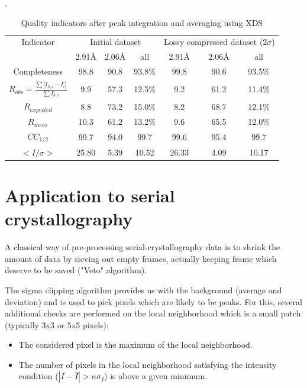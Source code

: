 \documentclass[a4paper,12pt,oneside]{article}              %
\begin{document}
\begin{table}[h]
\begin{center}
\label{xds_summary}
\caption{Quality indicators after peak integration and averaging using XDS\cite{xds}}.
\begin{tabular}{|c|c c c|c c c|} 
\hline
Indicator & \multicolumn{3}{c|}{Initial dataset} & \multicolumn{3}{c|}{Lossy compressed dataset ($2\sigma$)} \\ 
          & 2.91\AA & 2.06\AA & all & 2.91\AA & 2.06\AA & all \\
\hline
Completeness                                        & 98.8& 90.8 & 93.8\% & 99.8& 90.6 & 93.5\% \\ 
$R_{obs}=\frac{\sum |I_{h,i}-I_{i}|}{\sum I_{h,i}}$ & 9.9 & 57.3& 12.5\% & 9.2 & 61.2&  11.4\%\\ 
$R_{expected}$                                      & 8.8 & 73.2& 15.0\% & 8.2 & 68.7 &  12.1\%\\
$R_{meas}$ \cite{Rmeas}  &10.3 &61.2& 13.2\% & 9.6 & 65.5 & 12.0\%\\
$CC_{1/2}$ \cite{cc1/2}  & 99.7 &94.0 & 99.7   & 99.6 & 95.4 & 99.7  \\
$<I/\sigma>$               & 25.80 & 5.39 & 10.52  & 26.33& 4.09 & 10.17 \\
\hline
\end{tabular}
\end{center}
\end{table}


\section{Application to serial crystallography}
A classical way of pre-processing serial-crystallography data is to shrink the amount of data by sieving out empty frames, actually keeping frame which deserve to be saved ("Veto" algorithm).

The sigma clipping algorithm provides us with the background (average and deviation) and is used to pick pixels which are likely to be peaks. 
For this,  several additional checks are performed on the local neighborhood which is a small patch (typically 3x3 or 5x5 pixels):
\begin{itemize}
\item The considered pixel is the maximum of the local neighborhood.
\item The number of pixels in the local neighborhood satisfying the intensity condition ($|I-\bar{I} |> n \sigma_{I}$)  is above a given minimum.
\end{itemize}
\end{document}
